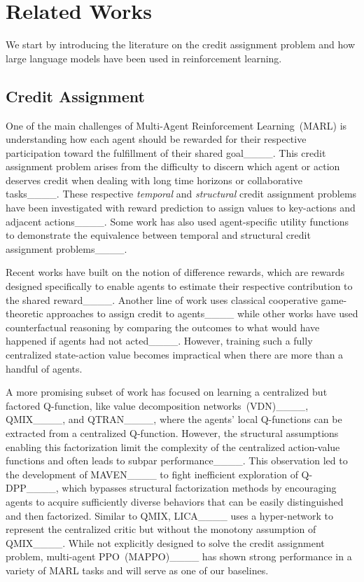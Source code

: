 \section{Related Works}
We start by introducing the literature on the credit assignment problem and how large language models have been used in reinforcement learning.


\subsection{Credit Assignment}
One of the main challenges of Multi-Agent Reinforcement Learning~(MARL) is understanding how each agent should be rewarded for their respective participation toward the fulfillment of their shared goal____. This credit assignment problem arises from the difficulty to discern which agent or action deserves credit when dealing with long time horizons or collaborative tasks____. These respective \emph{temporal} and \emph{structural} credit assignment problems have been investigated with reward prediction to assign values to key-actions and adjacent actions____. Some work has also used agent-specific utility functions to demonstrate the equivalence between temporal and structural credit assignment problems____.

Recent works have built on the notion of difference rewards, which are rewards designed specifically to enable agents to estimate their respective contribution to the shared reward____. Another line of work uses classical cooperative game-theoretic approaches to assign credit to agents____ while other works have used counterfactual reasoning by comparing the outcomes to what would have happened if agents had not acted____. However, training such a fully centralized state-action value becomes impractical when there are more than a handful of agents.

A more promising subset of work has focused on learning a centralized but factored Q-function, like value decomposition networks~(VDN)____, QMIX____, and QTRAN____, where the agents' local Q-functions can be extracted from a centralized Q-function. However, the structural assumptions enabling this factorization limit the complexity of the centralized action-value functions and often leads to subpar performance____. This observation led to the development of MAVEN____ to fight inefficient exploration of Q-DPP____, which bypasses structural factorization methods by encouraging agents to acquire sufficiently diverse behaviors that can be easily distinguished and then factorized. Similar to QMIX, LICA____ uses a hyper-network to represent the centralized critic but without the monotony assumption of QMIX____. While not explicitly designed to solve the credit assignment problem, multi-agent PPO~(MAPPO)____ has shown strong performance in a variety of MARL tasks and will serve as one of our baselines.

